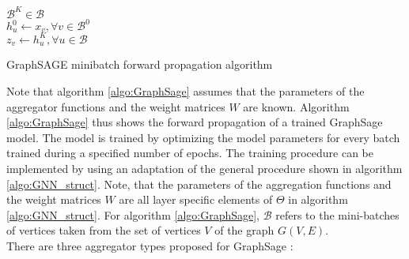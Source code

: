 	\begin{algorithm}[h]
		\scriptsize
		\SetAlgoLined
		\nl $\mathcal{B}^{K}\in\mathcal{B}$\\
		\nl {}
		\nl $h_{u}^{0}\leftarrow x_{v},\forall v \in \mathcal{B}^{0}$\\
		\nl {}
		\nl $z_v \leftarrow h_{u}^{K},\forall u \in \mathcal{B}$
		\caption{GraphSAGE minibatch forward propagation algorithm}
		\label{algo:GraphSage}
	\end{algorithm}
	
	\noindent Note that algorithm \ref{algo:GraphSage} assumes that the
	parameters of the aggregator functions and the weight matrices $W$
	are known. Algorithm \ref{algo:GraphSage} thus shows the forward
	propagation of a trained GraphSage model. The model is trained by
	optimizing the model parameters for every batch trained during a specified 
	number of epochs. The training procedure can be implemented by using an
	adaptation of the general procedure shown in algorithm 
	\ref{algo:GNN_struct}. Note, that the parameters of the aggregation
	functions and the weight matrices $W$ are all layer specific elements of
	$\Theta$ in algorithm \ref{algo:GNN_struct}. For algorithm
	\ref{algo:GraphSage}, $\mathcal{B}$ refers to the mini-batches of vertices
	taken from the set of vertices $V$ of the graph $G(V,E)$. \\

	\noindent There are three aggregator types proposed for GraphSage
	\citep{hamilton2017inductive}:

